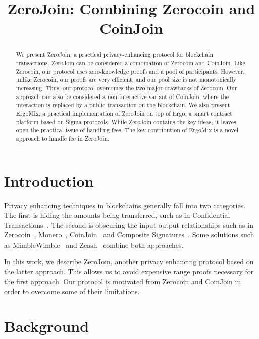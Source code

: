\documentclass[runningheads]{llncs}
\newcommand{\mixname}{ErgoMix\xspace}
\newcommand{\zerocoin}{Zerocoin\xspace}
\begin{document}
\newcommand{\algname}{ZeroJoin\xspace}
\title{\algname: Combining \zerocoin and CoinJoin}

\maketitle

\begin{abstract}

We present \algname, a practical privacy-enhancing protocol for blockchain transactions. \algname can be considered a combination of \zerocoin and CoinJoin. 
Like \zerocoin, our protocol uses zero-knowledge proofs and a pool of
participants. However, unlike \zerocoin, our proofs are very efficient, and our pool size is not monotonically increasing.
Thus, our protocol overcomes the two major drawbacks of \zerocoin. Our approach can also be considered a non-interactive variant of CoinJoin, where the interaction is replaced by a public transaction on the blockchain. We also present \mixname, a practical implementation of \algname on top of Ergo, a smart contract platform based on Sigma protocols. While \algname contains the key ideas, it leaves open the practical issue of handling fees. The key contribution of \mixname is a novel approach to handle fee in \algname. 

\end{abstract}

\section{Introduction}
\label{intro}

Privacy enhancing techniques in blockchains generally fall into two categories. The first is hiding the amounts being transferred, such as in Confidential Transactions~\cite{ct}. The second is obscuring the input-output relationships such as in \zerocoin~\cite{zerocoin}, Monero~\cite{monero}, CoinJoin~\cite{coinjoin} and Composite Signatures~\cite{composite}. Some solutions such as MimbleWimble~\cite{mw} and Zcash~\cite{zcash,zcash1} combine both approaches.

In this work, we describe \algname, another privacy enhancing protocol based on the latter approach. This allows us to avoid expensive range proofs necessary for the first approach. Our protocol is motivated from \zerocoin and CoinJoin in order to overcome some of their limitations.


\section{Background}
\end{document}

